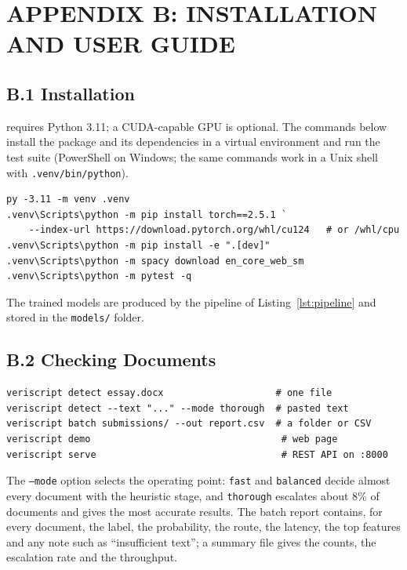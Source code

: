 \clearpage
\chapter*{APPENDIX B: INSTALLATION AND USER GUIDE}
{}

\section*{B.1 Installation}

\veriscript{} requires Python 3.11; a CUDA-capable GPU is optional. The commands
below install the package and its dependencies in a virtual environment and run
the test suite (PowerShell on Windows; the same commands work in a Unix shell
with \texttt{.venv/bin/python}).

\begin{lstlisting}[language={},numbers=none,caption={Installation},label={lst:install}]
py -3.11 -m venv .venv
.venv\Scripts\python -m pip install torch==2.5.1 `
    --index-url https://download.pytorch.org/whl/cu124   # or /whl/cpu
.venv\Scripts\python -m pip install -e ".[dev]"
.venv\Scripts\python -m spacy download en_core_web_sm
.venv\Scripts\python -m pytest -q
\end{lstlisting}

The trained models are produced by the pipeline of Listing~\ref{lst:pipeline}
and stored in the \texttt{models/} folder.

\section*{B.2 Checking Documents}

\begin{lstlisting}[language={},numbers=none,caption={Checking documents from the command line},label={lst:userguide}]
veriscript detect essay.docx                    # one file
veriscript detect --text "..." --mode thorough  # pasted text
veriscript batch submissions/ --out report.csv  # a folder or CSV
veriscript demo                                  # web page
veriscript serve                                 # REST API on :8000
\end{lstlisting}

The \texttt{--mode} option selects the operating point: \texttt{fast} and
\texttt{balanced} decide almost every document with the heuristic stage, and
\texttt{thorough} escalates about 8\% of documents and gives the most accurate
results. The batch report contains, for every document, the label, the
probability, the route, the latency, the top features and any note such as
``insufficient text''; a summary file gives the counts, the escalation rate and
the throughput.

